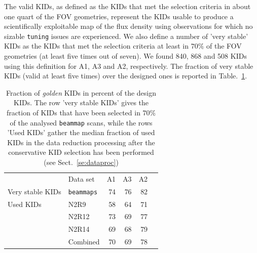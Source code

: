 The valid KIDs, as defined as the KIDs that met the selection
criteria in about one quart of the FOV geometries, represent the KIDs
usable to produce a scientifically exploitable map of the flux
density using observations for which no sizable {\tt tuning}
issues are experienced. We also define a number of 'very stable'
KIDs as the KIDs that met the selection criteria at least in
$70\%$ of the FOV geometries (at least five times out of seven). We
found 840, 868 and 508 KIDs using this definition for A1, A3 and A2,
respectively. The fraction of very stable KIDs (valid at least five
times) over the designed ones is reported in Table.~\ref{tab:eta_used}.   
\begin{table}[!htbp]
  \centering
  \caption[]{Fraction of \emph{golden} KIDs in percent of the design
  KIDs. The row 'very stable KIDs' gives the fraction of KIDs that have been selected
  in $70\%$ of the analysed {\tt beammap} scans, while the rows 'Used KIDs' gather
  the median fraction of used KIDs in the data reduction processing
  after the conservative KID selection has been performed (see Sect.~\ref{se:dataproc})}
  \label{tab:eta_used}
  \begin{tabular}{llrrrr}
    \hline\hline
    \noalign{\smallskip}
    &  Data set   & A1      &   A3    &     A2 \\
    \noalign{\smallskip}
    \hline
    \noalign{\smallskip}
    Very stable KIDs & {\tt beammaps} & 74  &  76  &  82  \\
    \hline
    \noalign{\smallskip}
    Used KIDs  & N2R9     & 58 &  64  & 71 \\
               & N2R12    & 73 &  69  & 77 \\
               & N2R14    & 69 &  68  & 79 \\
               & Combined & 70 &  69  & 78 \\
    \hline
  \end{tabular}
\end{table}

